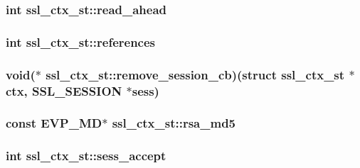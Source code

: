 \hypertarget{structssl__ctx__st_a454cbb1294b6b36ab36cff39c541ba70}{
\subsubsection[{read\-\_\-ahead}]{\setlength{\rightskip}{0pt plus 5cm}int ssl\-\_\-ctx\-\_\-st\-::read\-\_\-ahead}}\label{structssl__ctx__st_a454cbb1294b6b36ab36cff39c541ba70}
\hypertarget{structssl__ctx__st_aaefa58bdf5771d0ae34e05dbc372f6c3}{
\subsubsection[{references}]{\setlength{\rightskip}{0pt plus 5cm}int ssl\-\_\-ctx\-\_\-st\-::references}}\label{structssl__ctx__st_aaefa58bdf5771d0ae34e05dbc372f6c3}
\hypertarget{structssl__ctx__st_a82fef836aeedd6eabb09c4443f8897de}{
\subsubsection[{remove\-\_\-session\-\_\-cb}]{\setlength{\rightskip}{0pt plus 5cm}void($\ast$ ssl\-\_\-ctx\-\_\-st\-::remove\-\_\-session\-\_\-cb)(struct {\bf ssl\-\_\-ctx\-\_\-st} $\ast$ctx, {\bf S\-S\-L\-\_\-\-S\-E\-S\-S\-I\-O\-N} $\ast$sess)}}\label{structssl__ctx__st_a82fef836aeedd6eabb09c4443f8897de}
\hypertarget{structssl__ctx__st_a297d3bf2019076959d84c41a41e7ac3b}{
\subsubsection[{rsa\-\_\-md5}]{\setlength{\rightskip}{0pt plus 5cm}const E\-V\-P\-\_\-\-M\-D$\ast$ ssl\-\_\-ctx\-\_\-st\-::rsa\-\_\-md5}}\label{structssl__ctx__st_a297d3bf2019076959d84c41a41e7ac3b}
\hypertarget{structssl__ctx__st_aba3d064c61173796e66924d878fc2b8a}{
\subsubsection[{sess\-\_\-accept}]{\setlength{\rightskip}{0pt plus 5cm}int ssl\-\_\-ctx\-\_\-st\-::sess\-\_\-accept}}\label{structssl__ctx__st_aba3d064c61173796e66924d878fc2b8a}
